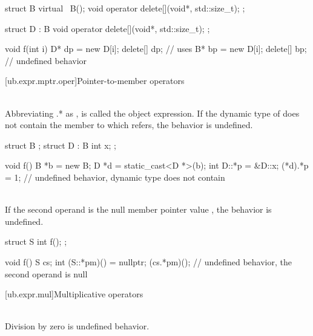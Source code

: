 \pnum
\begin{example}
\begin{codeblock}
struct B {
  virtual ~B();
  void operator delete[](void*, std::size_t);
};

struct D : B {
  void operator delete[](void*, std::size_t);
};

void f(int i) {
  D* dp = new D[i];
  delete[] dp;          // uses 
  B* bp = new D[i];
  delete[] bp;          // undefined behavior
}
\end{codeblock}
\end{example}


[ub.expr.mptr.oper]{Pointer-to-member operators}

\pnum
{} \\
Abbreviating .* as ,  is called the object expression. If the dynamic type
of  does not contain the member to which  refers, the behavior is undefined.

\pnum
\begin{example}
\begin{codeblock}
struct B {};
struct D : B {
  int x;
};

void f() {
  B *b = new B;
  D *d = static_cast<D *>(b);
  int D::*p = &D::x;
  (*d).*p = 1;          // undefined behavior, dynamic type  does not contain 
}
\end{codeblock}
\end{example}


\pnum
{} \\
If the second operand is the null
member pointer value , the behavior is undefined.

\pnum
\begin{example}
\begin{codeblock}
struct S {
  int f();
};

void f() {
  S cs;
  int (S::*pm)() = nullptr;
  (cs.*pm)();           // undefined behavior, the second operand is null
}
\end{codeblock}
\end{example}


[ub.expr.mul]{Multiplicative operators}

\pnum
{} \\
Division by zero is undefined behavior.

